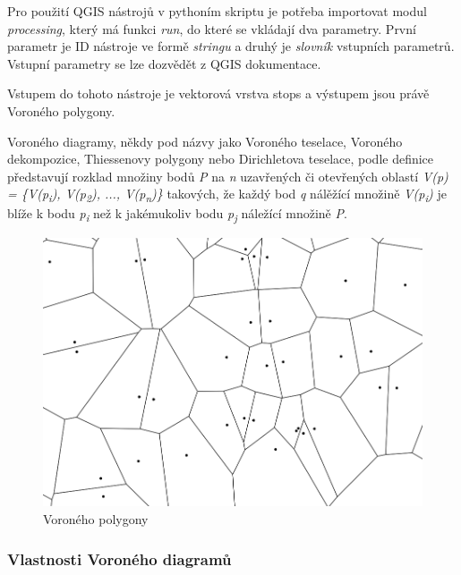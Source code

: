 Pro použití QGIS nástrojů v pythoním skriptu je potřeba importovat modul \textit{processing},
který má funkci \textit{run}, do které se vkládají dva parametry. První parametr je ID nástroje
ve formě \textit{stringu} a druhý je \textit{slovník} vstupních parametrů. Vstupní parametry se lze dozvědět
z QGIS dokumentace. \cite{QGIS_docs}

Vstupem do tohoto nástroje je vektorová vrstva stops a výstupem jsou právě Voroného polygony.

Voroného diagramy, někdy pod názvy jako Voroného teselace, Voroného dekompozice,
Thiessenovy polygony nebo Dirichletova teselace, podle definice představují
rozklad množiny bodů \textit{P} na \textit{n} uzavřených či 
otevřených oblastí \textit{V(p) = \{V(p\textsubscript{i}), V(p\textsubscript{2}), ...,
V(p\textsubscript{n})\}} takových, že každý bod
\textit{q} nálěžící množině \textit{V(p\textsubscript{i})} je blíže k bodu
\textit{p\textsubscript{i}} než k jakémukoliv
bodu \textit{p\textsubscript{j}} náležící množině \textit{P}. \cite{bayer}

\begin{figure}[H] \centering
    \includegraphics[width=400pt]{./pictures/voronoi.png}
    \caption[Voroného polygony]{Voroného polygony}
	\label{fig:voronoi}              
\end{figure}     

\subsubsection{Vlastnosti Voroného diagramů}

